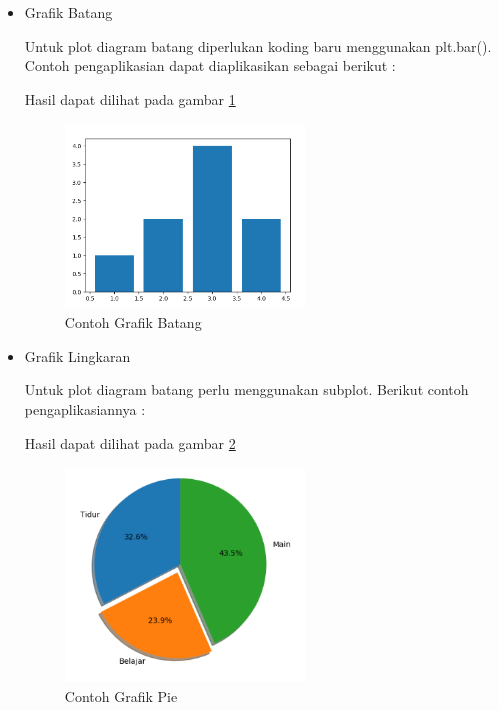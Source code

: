 \begin{itemize}
	\item Grafik Batang
	
	Untuk plot diagram batang diperlukan koding baru menggunakan plt.bar(). Contoh pengaplikasian dapat diaplikasikan sebagai berikut : 
	
	Hasil dapat dilihat pada gambar \ref{Contoh_Soal3Batang}
	\begin{figure} [ht]
		\centerline{\includegraphics[width=0.6\textwidth]{figures/6/1174035/Teori/Soal3Batang.png}}
		\caption{Contoh Grafik Batang}
		\label{Contoh_Soal3Batang}
	\end{figure}
	
	\item Grafik Lingkaran
	
	Untuk plot diagram batang perlu menggunakan subplot. Berikut contoh pengaplikasiannya : 
	
	Hasil dapat dilihat pada gambar \ref{Contoh_Soal3Pie}
	\begin{figure} [ht]
		\centerline{\includegraphics[width=0.6\textwidth]{figures/6/1174035/Teori/Soal3Pie.png}}
		\caption{Contoh Grafik Pie}
		\label{Contoh_Soal3Pie}
	\end{figure}
\end{itemize}

